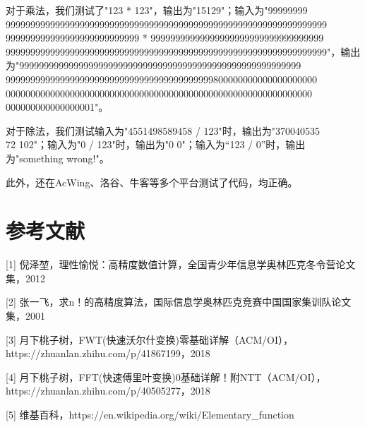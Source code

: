 \documentclass{article}
\begin{document}
对于乘法，我们测试了"123 * 123"，输出为"15129"；输入为"99999999\\99999999999999999999999999999999999999999999999999999999999999999\\999999999999999999999999999 * 99999999999999999999999999999999999\\99999999999999999999999999999999999999999999999999999999999999999"，输出为"999999999999999999999999999999999999999999999999999999999\\999999999999999999999999999999999999999999800000000000000000000\\00000000000000000000000000000000000000000000000000000000000000\\000000000000000001"。

对于除法，我们测试输入为"4551498589458 / 123"时，输出为"370040535\\72 102"；输入为"0 / 123"时，输出为"0 0"；输入为“123 / 0”时，输出为"something wrong!"。

此外，还在AcWing、洛谷、牛客等多个平台测试了代码，均正确。

\section{参考文献}
[1] 倪泽堃，理性愉悦：高精度数值计算，全国青少年信息学奥林匹克冬令营论文集，2012

[2] 张一飞，求n！的高精度算法，国际信息学奥林匹克竞赛中国国家集训队论文集，2001

[3] 月下桃子树，FWT(快速沃尔什变换)零基础详解（ACM/OI），https://zhuanlan.zhihu.com/p/41867199，2018

[4] 月下桃子树，FFT(快速傅里叶变换)0基础详解！附NTT（ACM/OI），https://zhuanlan.zhihu.com/p/40505277，2018

[5] 维基百科，https://en.wikipedia.org/wiki/Elementary\_function
\end{document}
